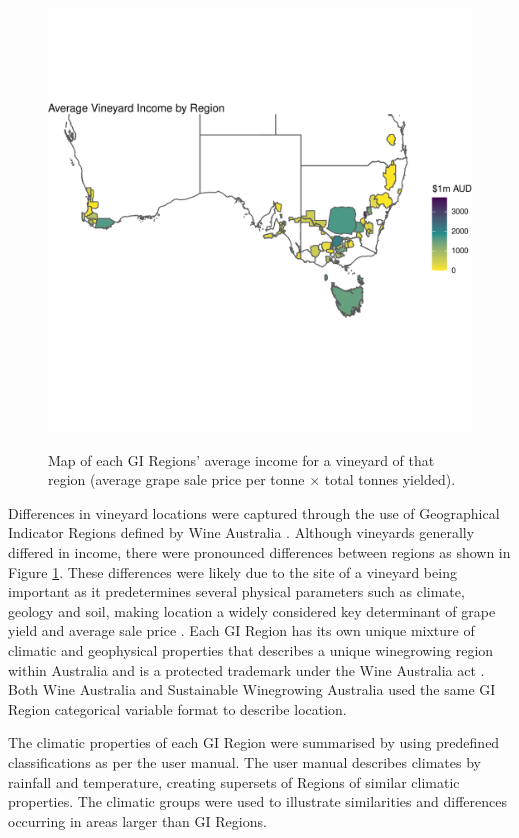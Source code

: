 \documentclass[review,12pt,authoryear]{elsarticle}
\begin{document}
\begin{linenumbers}
\begin{figure}
{  \includegraphics{my_map.pdf}}
  \caption{Map of each GI Regions' average income for a vineyard of that region (average grape sale price per tonne $\times$ total tonnes yielded).}\label{fig:map}
\end{figure}%

\par
Differences in vineyard locations were captured through the use of Geographical Indicator Regions defined by Wine Australia \citep{hallidayAustralianWineEncyclopedia2009,oliverReviewSoilPhysical2013,soarClimateDriversRed2008}. Although vineyards generally differed in income, there were pronounced differences between regions as shown in Figure \ref{fig:map}. These differences were likely due to the site of a vineyard being important as it predetermines several physical parameters such as climate, geology and soil, making location a widely considered key determinant of grape yield and average sale price \citep{abbalDecisionSupportSystem2016,agostaRegionalClimateVariability2012,fragaMultivariateClusteringViticultural2017}. Each GI Region has its own unique mixture of climatic and geophysical properties that describes a unique winegrowing region within Australia and is a protected trademark under the Wine Australia act \citep{attorney-generalsdepartmentWineAustraliaCorporation2010}. Both Wine Australia and Sustainable Winegrowing Australia used the same GI Region categorical variable format to describe location.
\par
 The climatic properties of each GI Region were summarised by using predefined classifications as per the \citet{sustainablewinegrowingaustraliaSustainableWinegrowingAustralia2021} user manual. The user manual describes climates by rainfall and temperature, creating supersets of Regions of similar climatic properties. The climatic groups were used to illustrate similarities and differences occurring in areas larger than GI Regions.
\par

\end{linenumbers}
\end{document}
